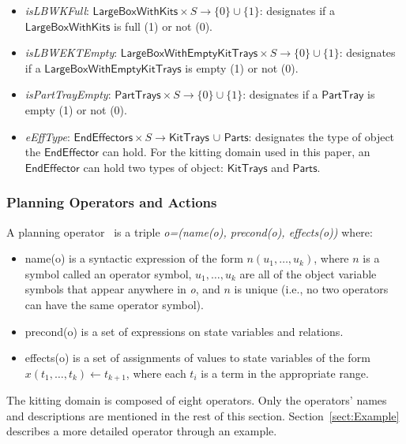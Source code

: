 \documentclass[a4paper, 10pt, conference]{ieeeconf}      %
\begin{document}
\begin{itemize}
\item \emph{isLBWKFull}: $\mathsf{LargeBoxWithKits}\times S\rightarrow \lbrace 0\rbrace \cup \lbrace 1\rbrace$: designates if a $\mathsf{LargeBoxWithKits}$ is full (1) or not (0).

\item \emph{isLBWEKTEmpty}: $\mathsf{LargeBoxWithEmptyKitTrays}\times S\rightarrow \lbrace 0\rbrace \cup \lbrace 1\rbrace$: designates if a $\mathsf{LargeBoxWithEmptyKitTrays}$ is empty (1) or not (0).

\item \emph{isPartTrayEmpty}: $\mathsf{PartTrays}\times S\rightarrow \lbrace 0\rbrace \cup \lbrace 1\rbrace$: designates if a $\mathsf{PartTray}$ is empty (1) or not (0).

\item \emph{eEffType}: $\mathsf{EndEffectors}\times S \rightarrow\mathsf{KitTrays}$ $\cup$ $\mathsf{Parts}$: designates the type of object the $\mathsf{EndEffector}$ can hold. For the kitting domain used in this paper, an $\mathsf{EndEffector}$ can hold two types of object: $\mathsf{KitTrays}$ and $\mathsf{Parts}$.
\end{itemize}

\subsubsection{Planning Operators and Actions}
\label{subsect:Planning_Operators}
A planning operator~\cite{NAU.2004} is a triple \textit{o=(name(o), precond(o), effects(o))}
where:
\begin{itemize}
\item name(o) is a syntactic expression of the form $n(u_1,\dots,u_k)$, where $n$ is a symbol
called an operator symbol, $u_1,\dots,u_k$ are all of the object variable symbols that
appear anywhere in \textit{o}, and $n$ is unique (i.e., no two operators can have the
same operator symbol).
\item precond(o) is a set of expressions on state variables and relations.
\item effects(o) is a set of assignments of values to state variables of the form
$x(t_1,\dots,t_k)\leftarrow t_{k+1}$, where each $t_i$ is a term in the appropriate range.
\end{itemize}

The kitting domain is composed of eight operators. Only the operators' names and descriptions are mentioned in the rest of this section. Section~\ref{sect:Example} describes a more detailed operator through an example.
\end{document}
